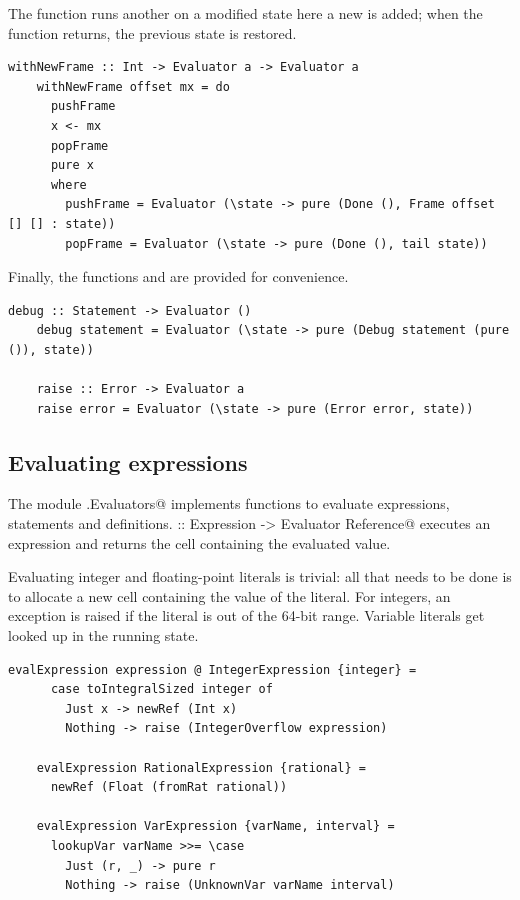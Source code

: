 \documentclass[UdineBachThesis,american,11pt]{PhdThesis}
\begin{document}
  \newpage

  The function \lstinline@withNewFrame@ runs another \lstinline@Evaluator@ on
  a modified state here a new \lstinline@Frame@ is added; when the function
  returns, the previous state is restored.

  \begin{lstlisting}[gobble=4,basicstyle=\ttfamily\small]
    withNewFrame :: Int -> Evaluator a -> Evaluator a
    withNewFrame offset mx = do
      pushFrame
      x <- mx
      popFrame
      pure x
      where
        pushFrame = Evaluator (\state -> pure (Done (), Frame offset [] [] : state))
        popFrame = Evaluator (\state -> pure (Done (), tail state))
  \end{lstlisting}

  Finally, the functions \lstinline@debug@ and \lstinline@raise@ are provided
  for convenience.

  \begin{lstlisting}[gobble=4,basicstyle=\ttfamily\small]
    debug :: Statement -> Evaluator ()
    debug statement = Evaluator (\state -> pure (Debug statement (pure ()), state))

    raise :: Error -> Evaluator a
    raise error = Evaluator (\state -> pure (Error error, state))
  \end{lstlisting}

  \subsection{Evaluating expressions}

  The module \lstinline@Devin.Evaluators@ implements functions to evaluate
  expressions, statements and definitions.
  \lstinline@evalExpression :: Expression -> Evaluator Reference@ executes an
  expression and returns the cell containing the evaluated value.

  Evaluating integer and floating-point literals is trivial: all that needs to
  be done is to allocate a new cell containing the value of the literal. For
  integers, an exception is raised if the literal is out of the 64-bit range.
  Variable literals get looked up in the running state.

  \begin{lstlisting}[gobble=4,basicstyle=\ttfamily\small]
    evalExpression expression @ IntegerExpression {integer} =
      case toIntegralSized integer of
        Just x -> newRef (Int x)
        Nothing -> raise (IntegerOverflow expression)

    evalExpression RationalExpression {rational} =
      newRef (Float (fromRat rational))

    evalExpression VarExpression {varName, interval} =
      lookupVar varName >>= \case
        Just (r, _) -> pure r
        Nothing -> raise (UnknownVar varName interval)
  \end{lstlisting}
\end{document}
